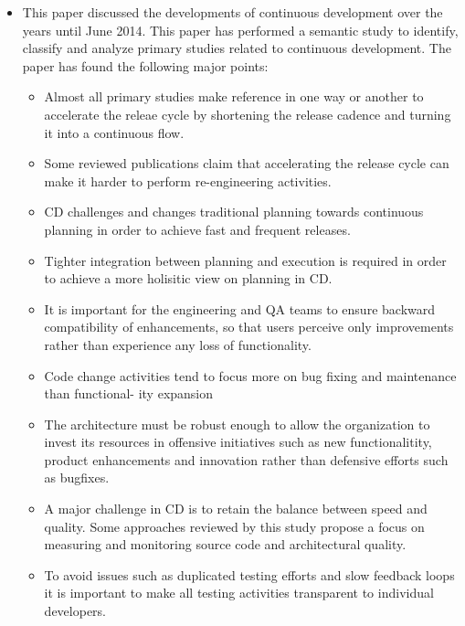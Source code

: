 \documentclass[]{book}
\providecommand{\tightlist}{%
  \setlength{\itemsep}{0pt}\setlength{\parskip}{0pt}}
\begin{document}
\begin{itemize}
\tightlist
\item
  This paper discussed the developments of continuous development over
  the years until June 2014. This paper has performed a semantic study
  to identify, classify and analyze primary studies related to
  continuous development. The paper has found the following major
  points:

  \begin{itemize}
  \tightlist
  \item
    Almost all primary studies make reference in one way or another to
    accelerate the releae cycle by shortening the release cadence and
    turning it into a continuous flow.
  \item
    Some reviewed publications claim that accelerating the release cycle
    can make it harder to perform re-engineering activities.
  \item
    CD challenges and changes traditional planning towards continuous
    planning in order to achieve fast and frequent releases.
  \item
    Tighter integration between planning and execution is required in
    order to achieve a more holisitic view on planning in CD.
  \item
    It is important for the engineering and QA teams to ensure backward
    compatibility of enhancements, so that users perceive only
    improvements rather than experience any loss of functionality.
  \item
    Code change activities tend to focus more on bug fixing and
    maintenance than functional- ity expansion
  \item
    The architecture must be robust enough to allow the organization to
    invest its resources in offensive initiatives such as new
    functionalitity, product enhancements and innovation rather than
    defensive efforts such as bugfixes.
  \item
    A major challenge in CD is to retain the balance between speed and
    quality. Some approaches reviewed by this study propose a focus on
    measuring and monitoring source code and architectural quality.
  \item
    To avoid issues such as duplicated testing efforts and slow feedback
    loops it is important to make all testing activities transparent to
    individual developers.
  \end{itemize}
\end{itemize}
\end{document}
